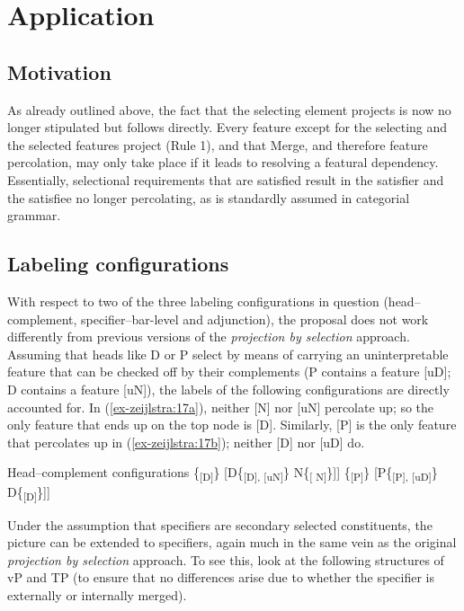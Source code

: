 \documentclass[output=paper
,modfonts
,nonflat]{langsci/langscibook}
\begin{document}
\section{Application}
\subsection{Motivation}
As already outlined above, the fact that the selecting element projects is now no longer stipulated but follows directly. Every feature except for the selecting and the selected features project (Rule 1), and that Merge, and therefore feature percolation, may only take place if it leads to resolving a featural dependency. Essentially, selectional requirements that are satisfied result in the satisfier and the satisfiee no longer percolating, as is standardly assumed in categorial grammar. 

\subsection{Labeling configurations} \label{sec-zeijlstra:3.2}
With respect to two of the three labeling configurations in question (head--complement, specifier--bar-level and adjunction), the proposal does not work differently from previous versions of the \textit{projection by selection} approach. Assuming that heads like D or P select by means of carrying an uninterpretable feature that can be checked off by their complements (P contains a feature [uD]; D contains a feature [uN]), the labels of the following configurations are directly accounted for. In (\ref{ex-zeijlstra:17a}), neither [N] nor [uN] percolate up; so the only feature that ends up on the top node is [D]. Similarly, [P] is the only feature that percolates up in (\ref{ex-zeijlstra:17b}); neither [D] nor [uD] do.

\begin{exe}
	\ex Head–complement configurations \label{ex-zeijlstra:17}
	\xlist
	\ex {[}\{\textsubscript{{[}D{]}}\} \label{ex-zeijlstra:17a} {[}D\{\textsubscript{{[}D{]}, {[}uN{]}}\} N\{\textsubscript{{[} N{]}}\}{]}{]}
	\ex {[}\{\textsubscript{{[}P{]}}\} \label{ex-zeijlstra:17b} {[}P\{\textsubscript{{[}P{]}, {[}uD{]}}\} D\{\textsubscript{{[}D{]}}\}{]}{]}
	\endxlist
\end{exe}
Under the assumption that specifiers are secondary selected constituents, the picture can be extended to specifiers, again much in the same vein as the original \textit{projection by selection} approach. To see this, look at the following structures of vP and TP (to ensure that no differences arise due to whether the specifier is externally or internally merged).
\end{document}
